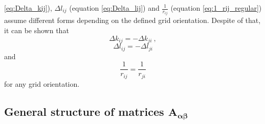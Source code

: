 \documentclass[manuscript,noblind]{geophysics}
\begin{document}
\ref{eq:Delta_kij}), $\Delta l_{ij}$ (equation \ref{eq:Delta_lij}) and 
$\tfrac{1}{r_{ij}}$ (equation \ref{eq:1_rij_regular}) assume different 
forms depending on the defined grid orientation.
Despite of that, it can be shown that
\begin{equation}
	\Delta k_{ij} = - \Delta k_{ji} \: ,
	\label{eq:Delta_kij_symmetry}
\end{equation}
\begin{equation}
	\Delta l_{ij} = - \Delta l_{ji}
	\label{eq:Delta_lij_symmetry}
\end{equation}
and 
\begin{equation}
	\frac{1}{r_{ij}} = \frac{1}{r_{ji}}
	\label{eq:1_rij_symmetry}
\end{equation}
for any grid orientation.

\subsection{General structure of matrices $\mathbf{A_{\boldsymbol{\alpha\beta}}}$}
\end{document}
